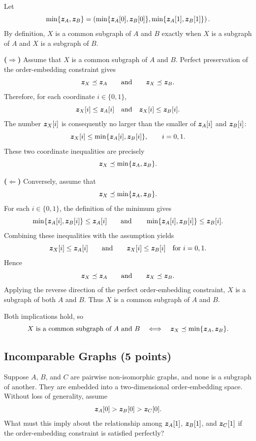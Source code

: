 \begin{solution}
Let
\[
  \min\{\bm{z}_A,\bm{z}_B\}
  =
  \left(
    \min\{\bm{z}_A[0],\bm{z}_B[0]\},
    \min\{\bm{z}_A[1],\bm{z}_B[1]\}
  \right).
\]
By definition, \(X\) is a common subgraph of \(A\) and \(B\) exactly when
\(X\) is a subgraph of \(A\) and \(X\) is a subgraph of \(B\).

\textbf{(\(\Longrightarrow\))} Assume that \(X\) is a common subgraph of
\(A\) and \(B\).  Perfect preservation of the order-embedding constraint gives
\[
  \bm{z}_X\preceq\bm{z}_A
  \qquad\text{and}\qquad
  \bm{z}_X\preceq\bm{z}_B.
\]
Therefore, for each coordinate \(i\in\{0,1\}\),
\[
  \bm{z}_X[i]\leq \bm{z}_A[i]
  \quad\text{and}\quad
  \bm{z}_X[i]\leq \bm{z}_B[i].
\]
The number \(\bm{z}_X[i]\) is consequently no larger than the smaller of
\(\bm{z}_A[i]\) and \(\bm{z}_B[i]\):
\[
  \bm{z}_X[i]
  \leq
  \min\{\bm{z}_A[i],\bm{z}_B[i]\},
  \qquad i=0,1.
\]
These two coordinate inequalities are precisely
\[
  \bm{z}_X\preceq
  \min\{\bm{z}_A,\bm{z}_B\}.
\]

\textbf{(\(\Longleftarrow\))} Conversely, assume that
\[
  \bm{z}_X\preceq
  \min\{\bm{z}_A,\bm{z}_B\}.
\]
For each \(i\in\{0,1\}\), the definition of the minimum gives
\[
  \min\{\bm{z}_A[i],\bm{z}_B[i]\}
  \leq \bm{z}_A[i]
  \qquad\text{and}\qquad
  \min\{\bm{z}_A[i],\bm{z}_B[i]\}
  \leq \bm{z}_B[i].
\]
Combining these inequalities with the assumption yields
\[
  \bm{z}_X[i]\leq\bm{z}_A[i]
  \qquad\text{and}\qquad
  \bm{z}_X[i]\leq\bm{z}_B[i]
  \quad\text{for }i=0,1.
\]
Hence
\[
  \bm{z}_X\preceq\bm{z}_A
  \qquad\text{and}\qquad
  \bm{z}_X\preceq\bm{z}_B.
\]
Applying the reverse direction of the perfect order-embedding constraint,
\(X\) is a subgraph of both \(A\) and \(B\).  Thus \(X\) is a common
subgraph of \(A\) and \(B\).

Both implications hold, so
\[
  X\text{ is a common subgraph of }A\text{ and }B
  \quad\Longleftrightarrow\quad
  \bm{z}_X\preceq\min\{\bm{z}_A,\bm{z}_B\}.
\]
\end{solution}

\subsection{Incomparable Graphs (5 points)}

Suppose \(A\), \(B\), and \(C\) are pairwise non-isomorphic graphs, and none is
a subgraph of another. They are embedded into a two-dimensional order-embedding
space. Without loss of generality, assume
\[
  \bm{z}_A[0]>\bm{z}_B[0]>\bm{z}_C[0].
\]
What must this imply about the relationship among
\(\bm{z}_A[1]\), \(\bm{z}_B[1]\), and \(\bm{z}_C[1]\) if the
order-embedding constraint is satisfied perfectly?

